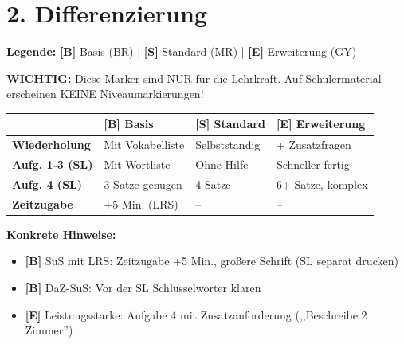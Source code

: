 \documentclass[11pt, a4paper]{article}
\newcommand{\B}{\textcolor{basis}{\textbf{[B]}}}
\newcommand{\Std}{\textcolor{standard}{\textbf{[S]}}}
\newcommand{\E}{\textcolor{erweiterung}{\textbf{[E]}}}
\begin{document}

\section*{2. Differenzierung}

\begin{differenzierung}
\textbf{Legende:} \B{} Basis (BR) | \Std{} Standard (MR) | \E{} Erweiterung (GY)

\vspace{0.5em}

\textbf{WICHTIG:} Diese Marker sind NUR fur die Lehrkraft. Auf Schulermaterial erscheinen KEINE Niveaumarkierungen!
\end{differenzierung}

\vspace{1em}

\begin{tabularx}{\textwidth}{|l|X|X|X|}
\hline
& \B{} \textbf{Basis} & \Std{} \textbf{Standard} & \E{} \textbf{Erweiterung} \\
\hline
\textbf{Wiederholung} & Mit Vokabelliste & Selbststandig & + Zusatzfragen \\
\hline
\textbf{Aufg. 1-3 (SL)} & Mit Wortliste & Ohne Hilfe & Schneller fertig \\
\hline
\textbf{Aufg. 4 (SL)} & 3 Satze genugen & 4 Satze & 6+ Satze, komplex \\
\hline
\textbf{Zeitzugabe} & +5 Min. (LRS) & -- & -- \\
\hline
\end{tabularx}

\vspace{1em}

\textbf{Konkrete Hinweise:}
\begin{itemize}
    \item \B{} SuS mit LRS: Zeitzugabe +5 Min., großere Schrift (SL separat drucken)
    \item \B{} DaZ-SuS: Vor der SL Schlusselworter klaren
    \item \E{} Leistungsstarke: Aufgabe 4 mit Zusatzanforderung (,,Beschreibe 2 Zimmer'')
\end{itemize}

\end{document}
